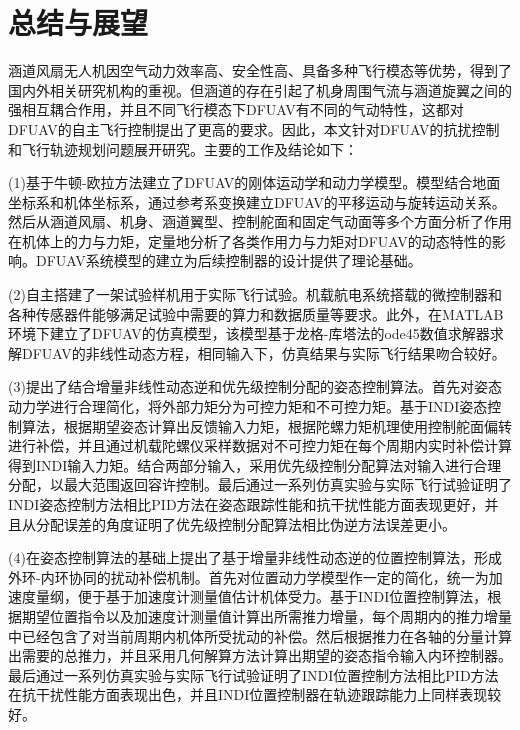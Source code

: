 \chapter{总结与展望}

涵道风扇无人机因空气动力效率高、安全性高、具备多种飞行模态等优势，得到了国内外相关研究机构的重视。但涵道的存在引起了机身周围气流与涵道旋翼之间的强相互耦合作用，并且不同飞行模态下DFUAV有不同的气动特性，这都对DFUAV的自主飞行控制提出了更高的要求。因此，本文针对DFUAV的抗扰控制和飞行轨迹规划问题展开研究。主要的工作及结论如下：

(1)基于牛顿-欧拉方法建立了DFUAV的刚体运动学和动力学模型。模型结合地面坐标系和机体坐标系，通过参考系变换建立DFUAV的平移运动与旋转运动关系。然后从涵道风扇、机身、涵道翼型、控制舵面和固定气动面等多个方面分析了作用在机体上的力与力矩，定量地分析了各类作用力与力矩对DFUAV的动态特性的影响。DFUAV系统模型的建立为后续控制器的设计提供了理论基础。

(2)自主搭建了一架试验样机用于实际飞行试验。机载航电系统搭载的微控制器和各种传感器件能够满足试验中需要的算力和数据质量等要求。此外，在MATLAB环境下建立了DFUAV的仿真模型，该模型基于龙格-库塔法的ode45数值求解器求解DFUAV的非线性动态方程，相同输入下，仿真结果与实际飞行结果吻合较好。

(3)提出了结合增量非线性动态逆和优先级控制分配的姿态控制算法。首先对姿态动力学进行合理简化，将外部力矩分为可控力矩和不可控力矩。基于INDI姿态控制算法，根据期望姿态计算出反馈输入力矩，根据陀螺力矩机理使用控制舵面偏转进行补偿，并且通过机载陀螺仪采样数据对不可控力矩在每个周期内实时补偿计算得到INDI输入力矩。结合两部分输入，采用优先级控制分配算法对输入进行合理分配，以最大范围返回容许控制。最后通过一系列仿真实验与实际飞行试验证明了INDI姿态控制方法相比PID方法在姿态跟踪性能和抗干扰性能方面表现更好，并且从分配误差的角度证明了优先级控制分配算法相比伪逆方法误差更小。

(4)在姿态控制算法的基础上提出了基于增量非线性动态逆的位置控制算法，形成外环-内环协同的扰动补偿机制。首先对位置动力学模型作一定的简化，统一为加速度量纲，便于基于加速度计测量值估计机体受力。基于INDI位置控制算法，根据期望位置指令以及加速度计测量值计算出所需推力增量，每个周期内的推力增量中已经包含了对当前周期内机体所受扰动的补偿。然后根据推力在各轴的分量计算出需要的总推力，并且采用几何解算方法计算出期望的姿态指令输入内环控制器。最后通过一系列仿真实验与实际飞行试验证明了INDI位置控制方法相比PID方法在抗干扰性能方面表现出色，并且INDI位置控制器在轨迹跟踪能力上同样表现较好。


